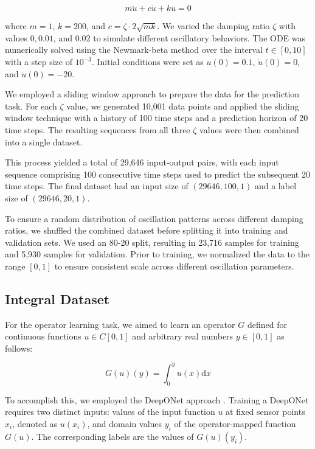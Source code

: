 \documentclass{article}
\theoremstyle{plain}
\theoremstyle{definition}
\theoremstyle{remark}
\begin{document}
\begin{equation}
   m \ddot{u} + c \dot{u} + k u = 0
\end{equation}

where $m = 1$, $k = 200$, and $c = \zeta \cdot 2\sqrt{m k}$.
We varied the damping ratio $\zeta$ with values $0, 0.01$, and $0.02$ to simulate different oscillatory behaviors.
The ODE was numerically solved using the Newmark-beta method over the interval $t \in [0, 10]$ with a step size of $10^{-3}$.
Initial conditions were set as $u(0) = 0.1$, $\dot{u}(0) = 0$, and $\ddot{u}(0) = -20$.

We employed a sliding window approach to prepare the data for the prediction task.
For each $\zeta$ value, we generated 10,001 data points and applied the sliding window technique with a history of 100 time steps and a prediction horizon of 20 time steps.
The resulting sequences from all three $\zeta$ values were then combined into a single dataset.

This process yielded a total of 29,646 input-output pairs, with each input sequence comprising 100 consecutive time steps used to predict the subsequent 20 time steps.
The final dataset had an input size of $(29646, 100, 1)$ and a label size of $(29646, 20, 1)$.

To ensure a random distribution of oscillation patterns across different damping ratios, we shuffled the combined dataset before splitting it into training and validation sets.
We used an 80-20 split, resulting in 23,716 samples for training and 5,930 samples for validation.
Prior to training, we normalized the data to the range $[0, 1]$ to ensure consistent scale across different oscillation parameters.

\subsection{Integral Dataset}

For the operator learning task, we aimed to learn an operator $G$ defined for continuous functions $u \in C[0,1]$ and arbitrary real numbers $y \in [0,1]$ as follows:

\begin{equation}
   G(u)(y) = \int_0^y u(x) \mathrm{d}x
\end{equation}

To accomplish this, we employed the DeepONet approach \cite{lu2021learning}.
Training a DeepONet requires two distinct inputs: values of the input function $u$ at fixed sensor points $x_i$, denoted as $u(x_i)$, and domain values $y_i$ of the operator-mapped function $G(u)$.
The corresponding labels are the values of $G(u)(y_i)$.
\end{document}
